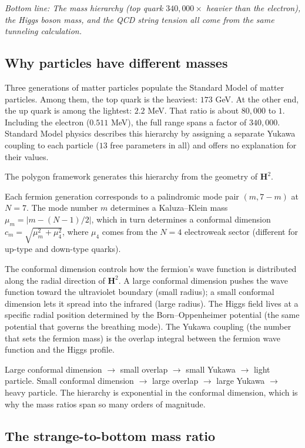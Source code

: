 \noindent\textit{Bottom line: The mass hierarchy (top quark
$340{,}000\times$ heavier than the electron), the Higgs boson mass,
and the QCD string tension all come from the same tunneling
calculation.}

\medskip

\subsection*{Why particles have different masses}

Three generations of matter particles populate the Standard Model of matter particles. Among them, the top
quark is the heaviest: $173$ GeV. At the other end, the up quark is among the lightest:
$2.2$ MeV. That ratio is about $80{,}000$ to $1$. Including the
electron ($0.511$ MeV), the full range spans a factor of $340{,}000$.
Standard Model physics describes this hierarchy by assigning a separate
Yukawa coupling to each particle ($13$ free parameters in all) and
offers no explanation for their values.

The polygon framework generates this hierarchy from the geometry of
$\mathbf{H}^2$.

Each fermion generation corresponds to a palindromic mode pair
$(m, 7 - m)$ at $N = 7$. The mode number $m$ determines a Kaluza--Klein
mass $\mu_m = |m - (N-1)/2|$, which in turn determines a conformal
dimension $c_m = \sqrt{\mu_m^2 + \mu_4^2}$, where $\mu_4$ comes from
the $N = 4$ electroweak sector (different for up-type and down-type
quarks).

The conformal dimension controls how the fermion's wave function is
distributed along the radial direction of $\mathbf{H}^2$. A large
conformal dimension pushes the wave function toward the ultraviolet
boundary (small radius); a small conformal dimension lets it spread
into the infrared (large radius). The Higgs field lives at a specific
radial position determined by the Born--Oppenheimer potential (the
same potential that governs the breathing mode). The Yukawa coupling
 (the number that sets the fermion mass) is the overlap integral
between the fermion wave function and the Higgs profile.

Large conformal dimension $\to$ small overlap $\to$ small Yukawa
$\to$ light particle. Small conformal dimension $\to$ large
overlap $\to$ large Yukawa $\to$ heavy particle. The hierarchy is
exponential in the conformal dimension, which is why the mass ratios
span so many orders of magnitude.

\subsection*{The strange-to-bottom mass ratio}

